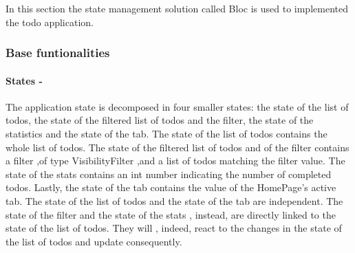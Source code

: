 In this section the state management solution called Bloc is used to implemented the todo application.
\subsubsection{Base funtionalities}  \label{par:todo_app_inherited_widget_introduction}
\paragraph{States - }
\label{subpar:todo_app_bloc_core_state}
The application state is decomposed in four smaller states: the state of the list of todos, the state of the filtered list of todos and the filter, the state of the statistics and the state of the tab. The state of the list of todos contains the whole list of todos. The state of the filtered list of todos and of the filter contains a filter ,of type VisibilityFilter ,and a list of todos matching the filter value. The state of the stats contains an int number indicating the number of completed todos. Lastly, the state of the tab contains the value of the HomePage’s active tab. The state of the list of todos and the state of the tab are independent. The state of the filter and the state of the stats , instead, are directly linked to the state of the list of todos. They will , indeed, react to the changes in the state of the list of todos and update consequently. 

